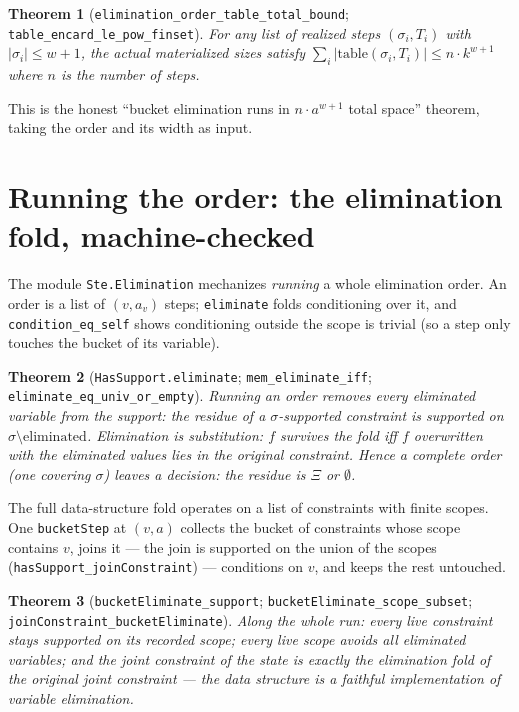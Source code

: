 \documentclass[11pt]{article}
\newtheorem{theorem}{Theorem}
\newcommand{\lean}[1]{\texttt{#1}}
\newcommand{\Xii}{\Xi}
\begin{document}
\begin{theorem}[\lean{elimination\_order\_table\_total\_bound};
\lean{table\_encard\_le\_pow\_finset}]
For any list of realized steps $(\sigma_i, T_i)$ with
$|\sigma_i| \le w + 1$, the \emph{actual} materialized sizes satisfy
$\sum_i |\mathrm{table}(\sigma_i, T_i)| \le n \cdot k^{w+1}$ where $n$
is the number of steps.
\end{theorem}

This is the honest ``bucket elimination runs in $n \cdot a^{w+1}$
total space'' theorem, taking the order and its width as input.

\section{Running the order: the elimination fold, machine-checked}

The module \lean{Ste.Elimination} mechanizes \emph{running} a whole
elimination order.  An order is a list of $(v, a_v)$ steps;
\lean{eliminate} folds conditioning over it, and
\lean{condition\_eq\_self} shows conditioning outside the scope is
trivial (so a step only touches the bucket of its variable).

\begin{theorem}[\lean{HasSupport.eliminate};
\lean{mem\_eliminate\_iff}; \lean{eliminate\_eq\_univ\_or\_empty}]
Running an order removes every eliminated variable from the support:
the residue of a $\sigma$-supported constraint is supported on
$\sigma \setminus \mathrm{eliminated}$.  Elimination is substitution:
$f$ survives the fold iff $f$ overwritten with the eliminated values
lies in the original constraint.  Hence a \emph{complete} order (one
covering $\sigma$) leaves a decision: the residue is $\Xii$ or
$\emptyset$.
\end{theorem}

The full data-structure fold operates on a list of constraints with
finite scopes.  One \lean{bucketStep} at $(v,a)$ collects the bucket
of constraints whose scope contains $v$, joins it --- the join is
supported on the union of the scopes
(\lean{hasSupport\_joinConstraint}) --- conditions on $v$, and keeps
the rest untouched.

\begin{theorem}[\lean{bucketEliminate\_support};
\lean{bucketEliminate\_scope\_subset};
\lean{joinConstraint\_bucketEliminate}]
Along the whole run: every live constraint stays supported on its
recorded scope; every live scope avoids all eliminated variables; and
the joint constraint of the state is exactly the elimination fold of
the original joint constraint --- the data structure is a faithful
implementation of variable elimination.
\end{theorem}
\end{document}
